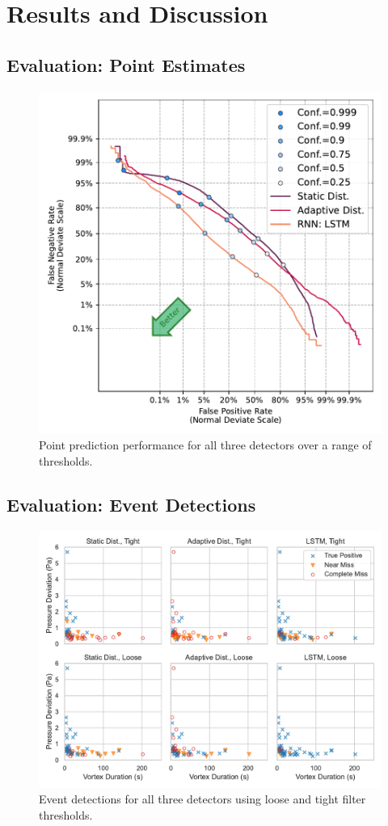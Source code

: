 \section{Results and Discussion}
\subsection{Evaluation: Point Estimates}

\begin{figure}
    \centering
    \includegraphics[width=.45\textwidth]    {figures/manuscript_det_curves_point_eval_gt_4xfwhm_v1.pdf}
    \caption{Point prediction performance for all three detectors over a range of thresholds.}
    \label{fig:point_prediction_performance}
\end{figure}

\subsection{Evaluation: Event Detections}
\label{subsec:evaluation_event_detections_results}

\begin{figure}
    \centering
    \includegraphics[width=.8\textwidth]    {figures/manuscript_system_performance_v1.pdf}
    \caption{Event detections for all three detectors using loose and tight filter thresholds.}
    \label{fig:system_performance}
\end{figure}

